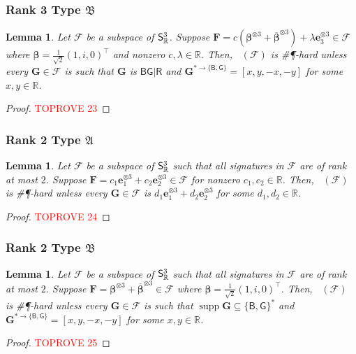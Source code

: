 \documentclass[11pt]{article}
\newtheorem{lemma}[theorem]{Lemma}
\DeclareMathOperator{\holts}{Holant^*_3}
\DeclareMathOperator{\supp}{supp}
\newcommand{\db}{\mathsf{B}}
\newcommand{\dg}{\mathsf{G}}
\newcommand{\dr}{\mathsf{R}}
\newcommand{\sph}{\#\P-hard\xspace}
\newcommand{\teh}{^{\otimes 3}}
\newcommand{\transpose}{^\intercal}
\newcommand{\domres}[1]{
  ^{*\to\{#1\}}
}
\newcommand{\ternarytractgeneq}{$\mathfrak{A}$\xspace}
\newcommand{\ternarytractz}{$\mathfrak{B}$\xspace}
\begin{document}
\subsubsection{Rank 3 Type \texorpdfstring{\ternarytractz}{B}}
\begin{lemma}\label{lem:dichotomy-subspace-rank-3-z}
  Let $\mathscr{F}$ be a subspace of $\mathsf{S}^3_{\mathbb{R}}$.
  Suppose $\mathbf{F} = c(\boldsymbol{\beta}\teh + \overline{\boldsymbol{\beta}}\teh ) + \lambda \mathbf{e}_3 \teh \in \mathscr{F}$ where $\boldsymbol{\beta} = \frac{1}{\sqrt{2}}(1, i, 0)\transpose$ and nonzero $c, \lambda \in \mathbb{R}$.
  Then, $\holts(\mathscr{F})$ is \sph unless every $\mathbf{G} \in \mathscr{F}$ is such that
  $\mathbf{G}$ is $\db \dg | \dr$ and $\mathbf{G}\domres{\db, \dg} = [x, y, -x, -y]$ for some $x, y \in \mathbb{R}$.
\end{lemma}
\begin{proof}\textcolor{red}{TOPROVE 23}\end{proof}

\subsubsection{Rank 2 Type \texorpdfstring{\ternarytractgeneq}{A}}
\begin{lemma}\label{lem:dichotomy-subspace-rank-2-geneq}
Let $\mathscr{F}$ be a subspace of $\mathsf{S}^3_{\mathbb{R}}$ such that all signatures in $\mathscr{F}$ are of rank at most $2$.
  Suppose $\mathbf{F} = c_1 \mathbf{e}_1 \teh + c_2 \mathbf{e}_2\teh \in \mathscr{F}$ for nonzero $c_1, c_2 \in \mathbb{R}$.
  Then, $\holts(\mathscr{F})$ is \sph unless every $\mathbf{G} \in \mathscr{F}$ is $d_1 \mathbf{e}_1 \teh + d_2 \mathbf{e}_2\teh$ for some $d_1, d_2 \in \mathbb{R}$.
\end{lemma}
\begin{proof}\textcolor{red}{TOPROVE 24}\end{proof}

\subsubsection{Rank 2 Type \texorpdfstring{\ternarytractz}{B}}
\begin{lemma}\label{lem:dichotomy-subspace-rank-2-z}
  Let $\mathscr{F}$ be a subspace of $\mathsf{S}^3_{\mathbb{R}}$ such that all signatures in $\mathscr{F}$ are of rank at most $2$.
  Suppose $\mathbf{F} = \boldsymbol{\beta}\teh + \overline{\boldsymbol{\beta}}\teh \in \mathscr{F}$ where $\boldsymbol{\beta} = \frac{1}{\sqrt{2}}(1, i, 0)\transpose$.
  Then, $\holts(\mathscr{F})$ is \sph unless every $\mathbf{G} \in \mathscr{F}$ is such that
  $\supp \mathbf{G} \subseteq \{\db, \dg\}^*$ and $\mathbf{G}\domres{\db, \dg} = [x, y, -x, -y]$ for some $x, y \in \mathbb{R}$.
\end{lemma}
\begin{proof}\textcolor{red}{TOPROVE 25}\end{proof}
\end{document}
